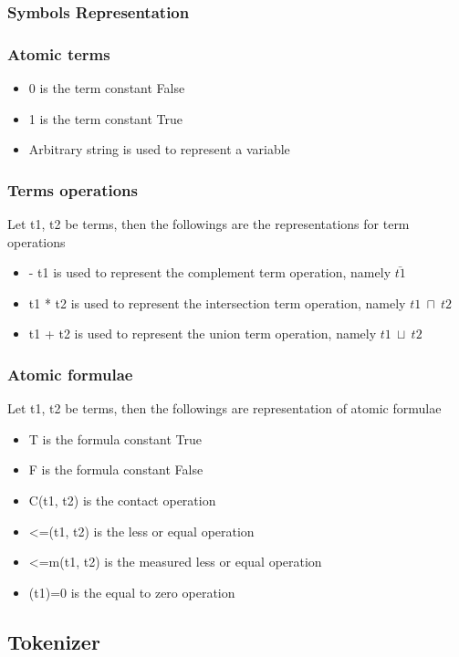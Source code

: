 \documentclass{article}
\begin{document}
	\subsubsection{Symbols Representation}
		\subsubsection*{Atomic terms}
		\begin{itemize}
			\item 0 is the term constant False
			\item 1 is the term constant True
			\item Arbitrary string is used to represent a variable
		\end{itemize}
		
		\subsubsection*{Terms operations}
		Let t1, t2 be terms, then the followings are the representations for term operations
		\begin{itemize}
			\item - t1 is used to represent the complement term operation, namely $\bar{t1}$
			\item t1 * t2 is used to represent the intersection term operation, namely $t1 \: \sqcap \: t2$
			\item t1 + t2 is used to represent the union term operation, namely $t1 \: \sqcup \: t2$
		\end{itemize}
		
		\subsubsection*{Atomic formulae}
		Let t1, t2 be terms, then the followings are representation of atomic formulae
		\begin{itemize}
			\item T is the formula constant True
			\item F is the formula constant False
			\item C(t1, t2) is the contact operation
			\item <=(t1, t2) is the less or equal operation
			\item <=m(t1, t2) is the measured less or equal operation
			\item (t1)=0 is the equal to zero operation
		\end{itemize}

	\subsection{Tokenizer}
\end{document}

